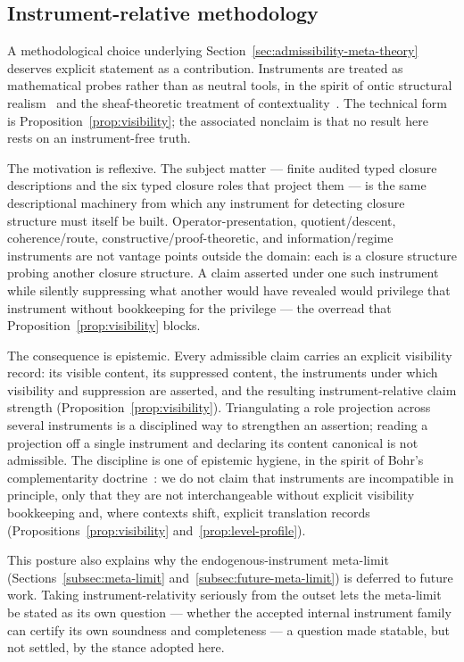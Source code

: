 \documentclass[11pt]{article}
\theoremstyle{definition}
\begin{document}
\subsection{Instrument-relative methodology}\label{subsec:discussion-instrument-relative}

A methodological choice underlying
Section~\ref{sec:admissibility-meta-theory} deserves explicit
statement as a contribution. Instruments are treated as mathematical
probes rather than as neutral tools, in the spirit of ontic structural
realism~\citep{LadymanRoss2007} and the sheaf-theoretic treatment of
contextuality~\citep{AbramskyBrandenburger2011}. The technical form
is Proposition~\ref{prop:visibility}; the associated nonclaim is that
no result here rests on an instrument-free truth.

The motivation is reflexive. The subject matter --- finite audited
typed closure descriptions and the six typed closure roles that
project them --- is the same descriptional machinery from which any
instrument for detecting closure structure must itself be built.
Operator-presentation, quotient/descent, coherence/route,
constructive/proof-theoretic, and information/regime instruments are
not vantage points outside the domain: each is a closure structure
probing another closure structure. A claim asserted under one such
instrument while silently suppressing what another would have
revealed would privilege that instrument without bookkeeping for the
privilege --- the overread that Proposition~\ref{prop:visibility}
blocks.

The consequence is epistemic. Every admissible claim carries an
explicit visibility record: its visible content, its suppressed
content, the instruments under which visibility and suppression are
asserted, and the resulting instrument-relative claim strength
(Proposition~\ref{prop:visibility}). Triangulating a role projection
across several instruments is a disciplined way to strengthen an
assertion; reading a projection off a single instrument and declaring
its content canonical is not admissible. The discipline is one of
epistemic hygiene, in the spirit of Bohr's complementarity
doctrine~\citep{Bohr1958}: we do not claim that instruments are
incompatible in principle, only that they are not interchangeable
without explicit visibility bookkeeping and, where contexts shift,
explicit translation records
(Propositions~\ref{prop:visibility} and~\ref{prop:level-profile}).

This posture also explains why the endogenous-instrument meta-limit
(Sections~\ref{subsec:meta-limit} and~\ref{subsec:future-meta-limit})
is deferred to future work. Taking instrument-relativity seriously
from the outset lets the meta-limit be stated as its own question ---
whether the accepted internal instrument family can certify its own
soundness and completeness --- a question made statable, but not
settled, by the stance adopted here.
\end{document}
